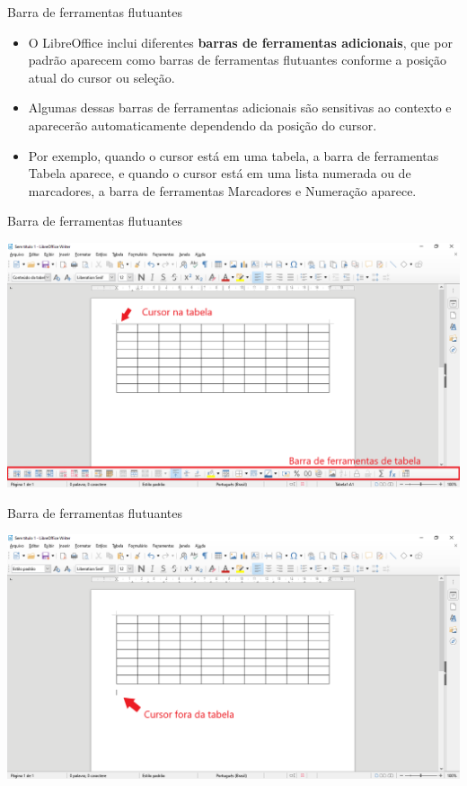 \begin{frame}{Barra de ferramentas flutuantes}
	\begin{block}{}
		\begin{itemize}
			\item O LibreOffice inclui diferentes \textbf{barras de ferramentas adicionais}, que por padrão aparecem como barras de ferramentas flutuantes conforme a posição atual do cursor ou seleção.
			\item Algumas dessas barras de ferramentas adicionais são sensitivas ao contexto e aparecerão automaticamente dependendo da posição do cursor.
			\item Por exemplo, quando o cursor está em uma tabela, a barra de ferramentas Tabela aparece, e quando o cursor está em uma lista numerada ou de marcadores, a barra de ferramentas Marcadores e Numeração aparece.
		\end{itemize}
	\end{block}
\end{frame}


\begin{frame}{Barra de ferramentas flutuantes}

	\centering
	\includegraphics[width=1\linewidth]{Figuras/Ch04/fig15}
\end{frame}


\begin{frame}{Barra de ferramentas flutuantes}

	\centering
	\includegraphics[width=1\linewidth]{Figuras/Ch04/fig16}
\end{frame}


